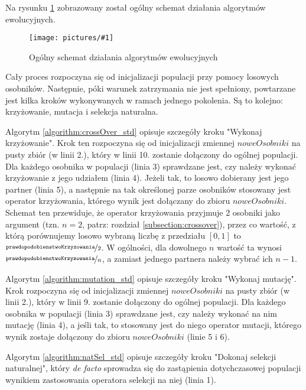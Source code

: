 \documentclass[twoside]{iisthesis}
\newcommand{\defacto}{\emph{de facto }}
\newcommand{\param}{\mathtt}
\newcommand{\img}[1]{\texttt{[image: pictures/\#1]}}
\begin{document}
\newpage

Na rysunku \ref{figure:ea_general} zobrazowany został ogólny schemat działania algorytmów ewolucyjnych. 

\begin{figure}
	\caption{Ogólny schemat działania algorytmów ewolucyjnych \label{figure:ea_general}}
	\img{ea_general.png}
\end{figure}

Cały proces rozpoczyna się od inicjalizacji populacji przy pomocy losowych osobników. Następnie, póki warunek zatrzymania nie jest spełniony, powtarzane jest kilka kroków wykonywanych w ramach jednego pokolenia. Są to kolejno: krzyżowanie, mutacja i selekcja naturalna.

Algorytm \ref{algorithm:crossOver_std} opisuje szczegóły kroku "Wykonaj krzyżowanie". Krok ten rozpoczyna się od inicjalizacji zmiennej $noweOsobniki$ na pusty zbiór (w linii 2.), który w linii 10. zostanie dołączony do ogólnej populacji. Dla każdego osobnika w populacji (linia 3) sprawdzane jest, czy należy wykonać krzyżowanie z jego udziałem (linia 4). Jeżeli tak, to losowo dobierany jest jego partner (linia 5), a następnie na tak określonej parze osobników stosowany jest operator krzyżowania, którego wynik jest dołączany do zbioru $noweOsobniki$. Schemat ten przewiduje, że operator krzyżowania przyjmuje 2 osobniki jako argument (tzn. $n = 2$, patrz: rozdział \ref{subsection:crossover}), przez co wartość, z którą porównujemy losowo wybraną liczbę z przedziału $[0, 1]$ to $\nicefrac{\param{prawdopodobienstwoKrzyzowania}}{2}$. W ogólności, dla dowolnego $n$ wartość ta wynosi $\nicefrac{\param{prawdopodobienstwoKrzyzowania}}{n}$, a zamiast jednego partnera należy wybrać ich $n-1$.

Algorytm \ref{algorithm:mutation_std} opisuje szczegóły kroku "Wykonaj mutację". Krok rozpoczyna się od inicjalizacji zmiennej $noweOsobniki$ na pusty zbiór (w linii 2.), który w linii 9. zostanie dołączony do ogólnej populacji. Dla każdego osobnika w populacji (linia 3) sprawdzane jest, czy należy wykonać na nim mutację (linia 4), a jeśli tak, to stosowany jest do niego operator mutacji, którego wynik zostaje dołączony do zbioru $noweOsobniki$ (linie 5 i 6).

Algorytm \ref{algorithm:natSel_std} opisuje szczegóły kroku "Dokonaj selekcji naturalnej", który \defacto sprowadza się do zastąpienia dotychczasowej populacji wynikiem zastosowania operatora selekcji na niej (linia 1).
\end{document}
